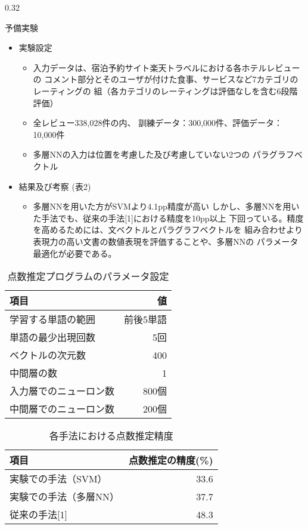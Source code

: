 \documentclass[10pt,unicode]{beamer}
\newcommand{\columnsize}{0.32}
\newcommand{\tablefontsize}{\small}
\begin{document}
\begin{frame}{}
\begin{columns}[t]
\begin{column}{\columnsize\textwidth}
\begin{block}{予備実験}
\begin{itemize}
      \item 実験設定
      \begin{itemize}
        \item 入力データは、宿泊予約サイト楽天トラベルにおける各ホテルレビューの
        コメント部分とそのユーザが付けた食事、サービスなど7カテゴリのレーティングの
        組（各カテゴリのレーティングは評価なしを含む6段階評価）
        \item 全レビュー338,028件の内、
        訓練データ：300,000件、評価データ：10,000件
        \item 多層NNの入力は位置を考慮した及び考慮していない2つの
        パラグラフベクトル
      \end{itemize}

      \item 結果及び考察 (表2)
      \begin{itemize}
        \item 多層NNを用いた方がSVMより4.1pp精度が高い
        しかし、多層NNを用いた手法でも、従来の手法[1]における精度を10pp以上
        下回っている。精度を高めるためには、文ベクトルとパラグラフベクトルを
        組み合わせより表現力の高い文書の数値表現を評価することや、多層NNの
        パラメータ最適化が必要である。
      \end{itemize}
    \end{itemize}

    \begin{table}
    \tablefontsize
    \caption{点数推定プログラムのパラメータ設定}
    \label{table:parameters}
    \begin{tabular}{l | r}
    項目 & 値 \\
    \hline
    学習する単語の範囲 & 前後5単語 \\
    単語の最少出現回数 & 5回 \\
    ベクトルの次元数 & 400 \\
    中間層の数 & 1 \\
    入力層でのニューロン数 & 800個 \\
    中間層でのニューロン数 & 200個
    \end{tabular}
    \end{table}

    \begin{table}
    \tablefontsize
    \caption{各手法における点数推定精度}
    \begin{tabular}{l | r}
    項目 & 点数推定の精度(\%) \\
    \hline
    実験での手法（SVM）& 33.6 \\
    実験での手法（多層NN）& 37.7 \\
    従来の手法[1] & 48.3
    \end{tabular}
    \end{table}
  \end{block} %


\end{column}
\end{columns}
\end{frame}
\end{document}
